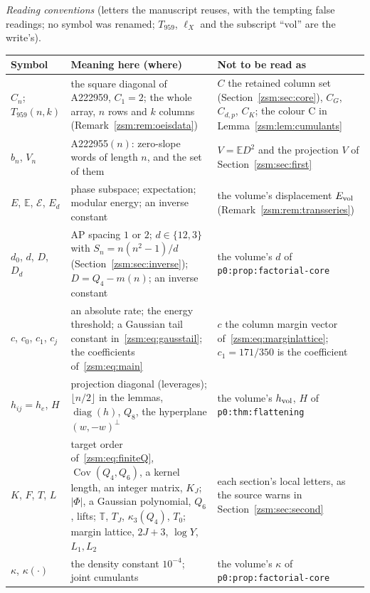 \documentclass[11pt]{article}
\theoremstyle{definition}\newtheorem{definition}[theorem]{Definition}
\theoremstyle{remark}\newtheorem{remark}[theorem]{Remark}
\newcommand{\T}{\mathbb T}
\newcommand{\E}{\mathbb E}
\newcommand{\file}[1]{\nolinkurl{#1}}
\begin{document}
\medskip\noindent\begin{minipage}{\textwidth}
\emph{Reading conventions} (letters the manuscript reuses, with the tempting
false readings; no symbol was renamed; $T_{959}$, $\ell_X$ and the
subscript ``vol'' are the write's).\par
\smallskip
\begingroup\small\renewcommand{\arraystretch}{1.1}
\noindent\begin{tabular}{@{}>{\raggedright\arraybackslash}p{0.9in}>{\raggedright\arraybackslash}p{3.05in}>{\raggedright\arraybackslash}p{2.15in}@{}}
\toprule
Symbol & Meaning here (where) & Not to be read as\\
\midrule
$C_n$; $T_{959}(n,k)$ & the square diagonal of A222959, $C_1=2$; the whole array, $n$ rows and $k$ columns (Remark~\ref{zsm:rem:oeisdata}) & $C$ the retained column set (Section~\ref{zsm:sec:core}), $C_G$, $C_{d,p}$, $C_K$; the colour C in Lemma~\ref{zsm:lem:cumulants}\\
$b_n$, $V_n$ & A222955$(n)$: zero-slope words of length $n$, and the set of them & $V=\E D^2$ and the projection $V$ of Section~\ref{zsm:sec:first}\\
$E$, $\E$, $\mathcal E$, $E_d$ & phase subspace; expectation; modular energy; an inverse constant & the volume's displacement $E_{\rm vol}$ (Remark~\ref{zsm:rem:transseries})\\
$d_0$, $d$, $D$, $D_d$ & AP spacing $1$ or $2$; $d\in\{12,3\}$ with $S_n=n(n^2-1)/d$ (Section~\ref{zsm:sec:inverse}); $D=Q_4-m(n)$; an inverse constant & the volume's $d$ of \file{p0:prop:factorial-core}\\
$c$, $c_0$, $c_1$, $c_j$ & an absolute rate; the energy threshold; a Gaussian tail constant in~\eqref{zsm:eq:gausstail}; the coefficients of~\eqref{zsm:eq:main} & $c$ the column margin vector of~\eqref{zsm:eq:marginlattice}; $c_1=171/350$ is the coefficient\\
$h_{ij}=h_e$, $H$ & projection diagonal (leverages); $\lfloor n/2\rfloor$ in the lemmas, $\operatorname{diag}(h)$, $Q_8$, the hyperplane $(w,-w)^\perp$ & the volume's $h_{\rm vol}$, $H$ of \file{p0:thm:flattening}\\
$K$, $F$, $T$, $L$ & target order of~\eqref{zsm:eq:finiteQ}, $\operatorname{Cov}(Q_4,Q_6)$, a kernel length, an integer matrix, $K_J$; $|\Phi|$, a Gaussian polynomial, $Q_6$, lifts; $\T$, $T_J$, $\kappa_3(Q_4)$, $T_0$; margin lattice, $2J+3$, $\log Y$, $L_1,L_2$ & each section's local letters, as the source warns in Section~\ref{zsm:sec:second}\\
$\kappa$, $\kappa(\cdot)$ & the density constant $10^{-4}$; joint cumulants & the volume's $\kappa$ of \file{p0:prop:factorial-core}\\

\end{tabular}
\end{minipage}
\end{document}
